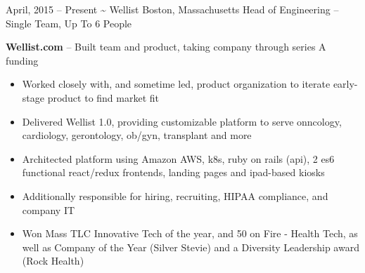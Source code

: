 \documentclass[print]{friggeri-cv}
\begin{document}
\begin{entrylist}
  \entryalt
    {April, 2015 -- Present}
    {\textbf{\textasciitilde} Wellist}
    {Boston, Massachusetts}
    {Head of Engineering -- Single Team, Up To 6 People}
    {\textbf{Wellist.com} -- Built team and product, taking company through series A funding
    \begin{itemize}
      \item Worked closely with, and sometime led, product organization to iterate early-stage product to find market fit
      \item Delivered Wellist 1.0, providing customizable platform to serve onncology, cardiology, gerontology, ob/gyn, transplant and more
      \item Architected platform using Amazon AWS, k8s, ruby on rails (api), 2 es6 functional react/redux frontends, landing pages and ipad-based kiosks
      \item Additionally responsible for hiring, recruiting, HIPAA compliance, and company IT
      \item Won Mass TLC Innovative Tech of the year, and 50 on Fire - Health Tech, as well as Company of the Year (Silver Stevie) and a Diversity Leadership award (Rock Health)
    \end{itemize}}


\end{entrylist}
\end{document}

